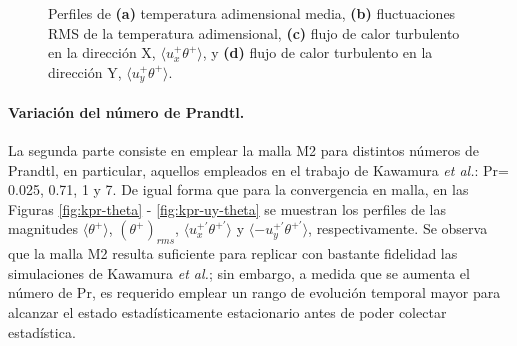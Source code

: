 \begin{figure}[H]
 \caption{Perfiles de \textbf{(a)} temperatura adimensional media, \textbf{(b)} fluctuaciones RMS de la temperatura adimensional, \textbf{(c)} flujo de calor turbulento en la dirección X, $\langle u^+_x \theta^+ \rangle$, y \textbf{(d)} flujo de calor turbulento en la dirección Y, $\langle u^+_y \theta^+ \rangle$.} 
 \label{fig:kmesh_1}
\end{figure}

\paragraph{Variación del número de Prandtl.}
La segunda parte consiste en emplear la malla M2 para distintos números de Prandtl, en particular, aquellos empleados en el trabajo de Kawamura \textit{et al.}: Pr= 0.025, 0.71, 1 y 7. De igual forma que para la convergencia en malla, en las Figuras \ref{fig:kpr-theta} - \ref{fig:kpr-uy-theta} se muestran los perfiles de las magnitudes $\langle \theta^+ \rangle$, $(\theta^+)_{rms}$, $\langle u^{+ \prime}_x \theta^{+ \prime} \rangle$ y $\langle - u^{+ \prime}_y \theta^{+ \prime} \rangle$, respectivamente. Se observa que la malla M2 resulta suficiente para replicar con bastante fidelidad las simulaciones de Kawamura \textit{et al.}; sin embargo, a medida que se aumenta el número de Pr, es requerido emplear un rango de evolución temporal mayor para alcanzar el estado estadísticamente estacionario antes de poder colectar estadística.

